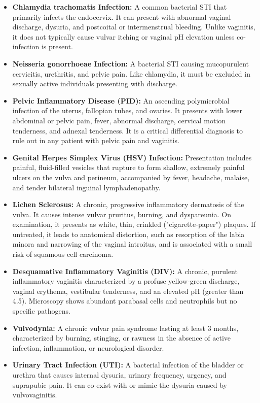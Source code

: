 \begin{itemize}
    \item \textbf{Chlamydia trachomatis Infection:} A common bacterial STI that primarily infects the endocervix. It can present with abnormal vaginal discharge, dysuria, and postcoital or intermenstrual bleeding. Unlike vaginitis, it does not typically cause vulvar itching or vaginal pH elevation unless co-infection is present.
    \item \textbf{Neisseria gonorrhoeae Infection:} A bacterial STI causing mucopurulent cervicitis, urethritis, and pelvic pain. Like chlamydia, it must be excluded in sexually active individuals presenting with discharge.
    \item \textbf{Pelvic Inflammatory Disease (PID):} An ascending polymicrobial infection of the uterus, fallopian tubes, and ovaries. It presents with lower abdominal or pelvic pain, fever, abnormal discharge, cervical motion tenderness, and adnexal tenderness. It is a critical differential diagnosis to rule out in any patient with pelvic pain and vaginitis.
    \item \textbf{Genital Herpes Simplex Virus (HSV) Infection:} Presentation includes painful, fluid-filled vesicles that rupture to form shallow, extremely painful ulcers on the vulva and perineum, accompanied by fever, headache, malaise, and tender bilateral inguinal lymphadenopathy.
    \item \textbf{Lichen Sclerosus:} A chronic, progressive inflammatory dermatosis of the vulva. It causes intense vulvar pruritus, burning, and dyspareunia. On examination, it presents as white, thin, crinkled ("cigarette-paper") plaques. If untreated, it leads to anatomical distortion, such as resorption of the labia minora and narrowing of the vaginal introitus, and is associated with a small risk of squamous cell carcinoma.
    \item \textbf{Desquamative Inflammatory Vaginitis (DIV):} A chronic, purulent inflammatory vaginitis characterized by a profuse yellow-green discharge, vaginal erythema, vestibular tenderness, and an elevated pH (greater than 4.5). Microscopy shows abundant parabasal cells and neutrophils but no specific pathogens.
    \item \textbf{Vulvodynia:} A chronic vulvar pain syndrome lasting at least 3 months, characterized by burning, stinging, or rawness in the absence of active infection, inflammation, or neurological disorder.
    \item \textbf{Urinary Tract Infection (UTI):} A bacterial infection of the bladder or urethra that causes internal dysuria, urinary frequency, urgency, and suprapubic pain. It can co-exist with or mimic the dysuria caused by vulvovaginitis.
\end{itemize}

